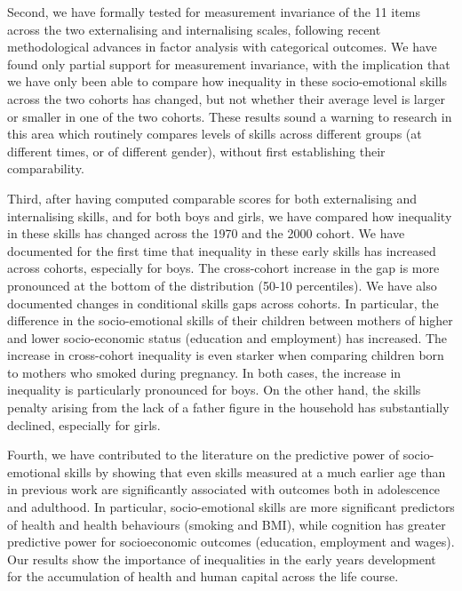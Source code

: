 Second, we have formally tested for measurement invariance of the 11 items across the two externalising and internalising scales, following recent methodological advances in factor analysis with categorical outcomes. We have found only partial support for measurement invariance, with the implication that we have only been able to compare how inequality in these socio-emotional skills across the two cohorts has changed, but not whether their average level is larger or smaller in one of the two cohorts. These results sound a warning to research in this area which routinely compares levels of skills across different groups (at different times, or of different gender), without first establishing their comparability.

Third, after having computed comparable scores for both externalising and internalising skills, and for both boys and girls, we have compared how inequality in these skills has changed across the 1970 and the 2000 cohort. We have documented for the first time that inequality in these early skills has increased across cohorts, especially for boys. The cross-cohort increase in the gap is more pronounced at the bottom of the distribution (50-10 percentiles). We have also documented changes in conditional skills gaps across cohorts. In particular, the difference in the socio-emotional skills of their children between mothers of higher and lower socio-economic status (education and employment) has increased. The increase in cross-cohort inequality is even starker when comparing children born to mothers who smoked during pregnancy. In both cases, the increase in inequality is particularly pronounced for boys. On the other hand, the skills penalty arising from the lack of a father figure in the household has substantially declined, especially for girls.

Fourth, we have contributed to the literature on the predictive power of socio-emotional skills by showing that even skills measured at a much earlier age than in previous work are significantly associated with outcomes both in adolescence and adulthood. In particular, socio-emotional skills are more significant predictors of health and health behaviours (smoking and BMI), while cognition has greater predictive power for socioeconomic outcomes (education, employment and wages). Our results show the importance of inequalities in the early years development for the accumulation of health and human capital across the life course. 
